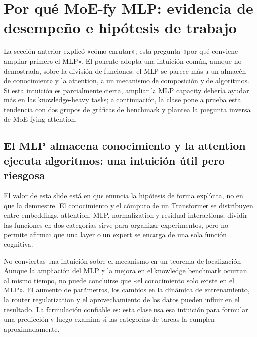 \section{Por qué MoE-fy MLP: evidencia de desempeño e hipótesis de trabajo}

La sección anterior explicó «cómo enrutar»; esta pregunta «por qué conviene ampliar primero el MLP». El ponente adopta una intuición común, aunque no demostrada, sobre la división de funciones: el MLP se parece más a un almacén de conocimiento y la attention, a un mecanismo de composición y de algoritmos. Si esta intuición es parcialmente cierta, ampliar la MLP capacity debería ayudar más en las knowledge-heavy tasks; a continuación, la clase pone a prueba esta tendencia con dos grupos de gráficas de benchmark y plantea la pregunta inversa de MoE-fying attention.

\subsection{El MLP almacena conocimiento y la attention ejecuta algoritmos: una intuición útil pero riesgosa}

El valor de esta slide está en que enuncia la hipótesis de forma explícita, no en que la demuestre. El conocimiento y el cómputo de un Transformer se distribuyen entre embeddings, attention, MLP, normalization y residual interactions; dividir las funciones en dos categorías sirve para organizar experimentos, pero no permite afirmar que una layer o un expert se encarga de una sola función cognitiva.


\begin{warningbox}{No conviertas una intuición sobre el mecanismo en un teorema de localización}
Aunque la ampliación del MLP y la mejora en el knowledge benchmark ocurran al mismo tiempo, no puede concluirse que «el conocimiento solo existe en el MLP». El aumento de parámetros, los cambios en la dinámica de entrenamiento, la router regularization y el aprovechamiento de los datos pueden influir en el resultado. La formulación confiable es: esta clase usa esa intuición para formular una predicción y luego examina si las categorías de tareas la cumplen aproximadamente.
\end{warningbox}


